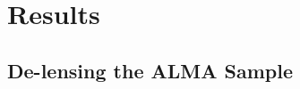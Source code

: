 \documentclass[iop]{emulateapj}
\begin{document}
%
%

%
%


\section{Results}\label{sec:results}

\subsection{De-lensing the ALMA Sample}\label{sec:lensing}
\end{document}
